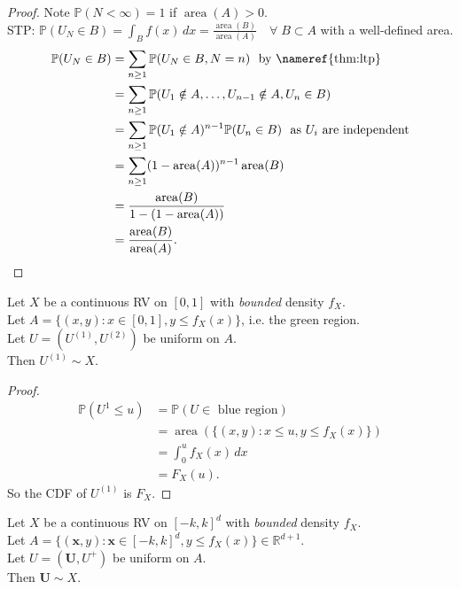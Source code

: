 \begin{proof}
    Note $\mathbb{P}(N < \infty) = 1$ if $\operatorname{area}(A) > 0$. \\
    STP: $\mathbb{P}(U_N \in B) = \int_B f(x) \, dx = \frac{\operatorname{area}(B)}{\operatorname{area}(A)} \quad \forall \; B \subset A$ with a well-defined area. 
    \begin{align*}
        \mathbb{P}(U_N \in B) &= \sum_{n \geq 1} \mathbb{P}(U_N \in B, N = n) \ \text{ by \nameref{thm:ltp}} \\
        &= \sum_{n \geq 1} \mathbb{P}(U_1 \notin A, \dots, U_{n - 1} \notin A, U_n \in B) \\
        &= \sum_{n \geq 1} \mathbb{P}(U_1 \notin A)^{n - 1} \mathbb{P}(U_n \in B) \ \text{ as $U_i$ are independent} \\
        &= \sum_{n \geq 1} (1 - \operatorname{area}(A))^{n - 1} \operatorname{area}(B) \\
        &= \frac{\operatorname{area}(B)}{1 - (1 - \operatorname{area}(A))} \\
        &= \frac{\operatorname{area}(B)}{\operatorname{area}(A)}.
    \end{align*} 
\end{proof} 

\begin{claim}
    Let $X$ be a continuous RV on $[0, 1]$ with \emph{bounded} density $f_X$. \\
    Let $A = \{(x, y): x \in [0, 1], y \leq f_X(x)\}$, i.e. the green region. \\
    Let $U = (U^{(1)}, U^{(2)})$ be uniform on $A$. \\
    Then $U^{(1)} \sim X$.
\end{claim} 

\begin{proof}
    \begin{align*}
        \mathbb{P}(U^{1} \leq u) &= \mathbb{P}(U \in \text{ blue region}) \\
        &= \operatorname{area}(\{(x, y): x \leq u, y \leq f_X(x)\}) \\
        &= \int_{0}^{u} f_X(x) \,dx \\
        &= F_X(u).
    \end{align*} 
    So the CDF of $U^{(1)}$ is $F_X$.
\end{proof} 

\begin{claim}
    Let $X$ be a continuous RV on $[-k, k]^d$ with \emph{bounded} density $f_X$. \\
    Let $A = \{(\bm x, y): \bm x \in [-k, k]^d, y \leq f_X(x)\} \in \mathbb{R}^{d + 1}$. \\
    Let $U = (\bm U, U^+)$ be uniform on $A$. \\
    Then $\bm U \sim X$.
\end{claim} 

